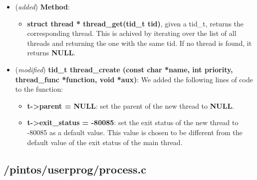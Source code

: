 \documentclass[11pt]{scrartcl}
\begin{document}
\begin{itemize}
    \item (\textit{added}) \textbf{Method}:
          \begin{itemize}
              \item \textbf{struct thread * thread\_get(tid\_t tid)}, given a tid\_t, returns the corresponding thread.
                    This is achived by iterating over the list of all threads and returning the one with the same tid.
                    If no thread is found, it returns \textbf{NULL}.
          \end{itemize}

    \item (\textit{modified}) \textbf{tid\_t thread\_create (const char *name, int priority, thread\_func *function, void *aux)}:
          We added the following lines of code to the function:
          \begin{itemize}
              \item \textbf{t->parent = NULL}: set the parent of the new thread to \textbf{NULL}.
              \item \textbf{t->exit\_status = -80085}: set the exit status of the new thread to -80085 as a default value.
                    This value is chosen to be different from the default value of the exit status of the main thread.
          \end{itemize}
\end{itemize}

\subsection*{/pintos/userprog/process.c}

\end{document}
